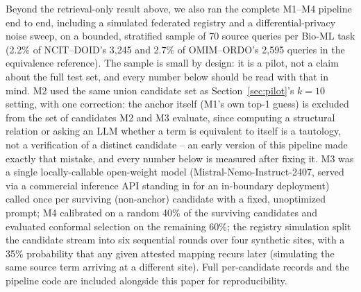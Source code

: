 \documentclass[conference]{IEEEtran}
\begin{document}
Beyond the retrieval-only result above, we also ran the complete M1--M4 pipeline end to end, including a simulated federated registry and a differential-privacy noise sweep, on a bounded, stratified sample of 70 source queries per Bio-ML task (2.2\% of NCIT--DOID's 3{,}245 and 2.7\% of OMIM--ORDO's 2{,}595 queries in the equivalence reference). The sample is small by design: it is a pilot, not a claim about the full test set, and every number below should be read with that in mind. M2 used the same union candidate set as Section~\ref{sec:pilot}'s $k{=}10$ setting, with one correction: the anchor itself (M1's own top-1 guess) is excluded from the set of candidates M2 and M3 evaluate, since computing a structural relation or asking an LLM whether a term is equivalent to itself is a tautology, not a verification of a distinct candidate -- an early version of this pipeline made exactly that mistake, and every number below is measured after fixing it. M3 was a single locally-callable open-weight model (Mistral-Nemo-Instruct-2407, served via a commercial inference API standing in for an in-boundary deployment) called once per surviving (non-anchor) candidate with a fixed, unoptimized prompt; M4 calibrated on a random 40\% of the surviving candidates and evaluated conformal selection on the remaining 60\%; the registry simulation split the candidate stream into six sequential rounds over four synthetic sites, with a 35\% probability that any given attested mapping recurs later (simulating the same source term arriving at a different site). Full per-candidate records and the pipeline code are included alongside this paper for reproducibility.
\end{document}
